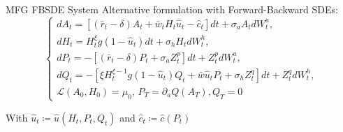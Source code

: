 \documentclass{beamer}
\begin{document}
\begin{frame}{MFG FBSDE System}
Alternative formulation with Forward-Backward SDEs:
\begin{equation}
    \begin{cases}
        d A_t = \left[ (\bar r_t - \delta) A_t + \bar w_t H_t {\hat u}_t - {\hat c}_t  \right] dt + \sigma_a A_t d W^a_t,\\
        d H_t = H^\xi_t g(1 - {\hat u}_t) dt + \sigma_h H_t d W^h_t,\\
        d P_t = -\left[ (\bar r_t - \delta) P_t + \sigma_a Z^p_t \right]dt + Z^p_t d W^a_t,\\
        d Q_t = - \left[ \xi H_t^{\xi - 1} g(1 - {\hat u}_t ) Q_t + {\bar w} {\hat u}_t P_t + \sigma_h Z^q_t \right] dt + Z^q_t d W^h_t,\\
        \mathcal{L}(A_0, H_0) = \mu_0, \, P_T = \partial_a Q(A_T), Q_T = 0
    \end{cases}
\end{equation}

With $\hat u_t \coloneqq \hat u(H_t,P_t,Q_t)$ and $\hat c_t \coloneqq \hat c(P_t)$
\end{frame}
\end{document}
